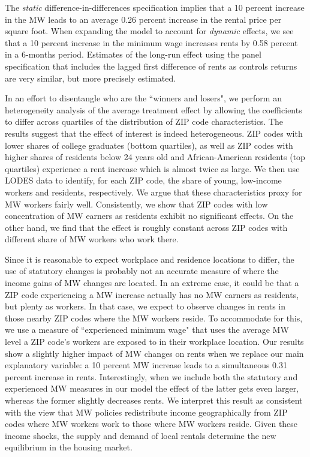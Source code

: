 The \textit{static} difference-in-differences specification implies that a 10 percent increase 
in the MW leads to an average 0.26 percent increase in the rental price per square foot. When 
expanding the model to account for \textit{dynamic} effects, we see that a 10 percent increase 
in the minimum wage increases rents by 0.58 percent in a 6-months period. Estimates of the 
long-run effect using the panel specification that includes the lagged first difference of rents 
as controls returns are very similar, but more precisely estimated.

In an effort to disentangle who are the ``winners and losers", we perform an heterogeneity 
analysis of the average treatment effect by allowing the coefficients to differ across quartiles 
of the distribution of ZIP code characteristics. The results suggest that the effect of interest 
is indeed heterogeneous. ZIP codes with lower shares of college graduates (bottom quartiles), as 
well as ZIP codes with higher shares of residents below 24 years old and African-American 
residents (top quartiles) experience a rent increase which is almost twice as large. We then use 
LODES data to identify, for each ZIP code, the share of young, low-income workers and residents, 
respectively. We argue that these characteristics proxy for MW workers fairly well. 
Consistently, we show that ZIP codes with low concentration of MW earners as residents 
exhibit no significant effects. On the other hand, we find that the effect is roughly constant 
across ZIP codes with different share of MW workers who work there.

Since it is reasonable to expect workplace and residence locations to differ, the use of 
statutory changes is probably not an accurate measure of where the income gains of MW changes
are located. In an extreme case, it could be that a ZIP code experiencing a MW increase actually 
has no MW earners as residents, but plenty as workers. In that case, we expect to observe 
changes in rents in those nearby ZIP codes where the MW workers reside. To accommodate for 
this, we use a measure of ``experienced minimum wage" that uses the average MW level 
a ZIP code's workers are exposed to in their workplace location. Our results show a slightly 
higher impact of MW changes on rents when we replace our main explanatory variable: a 10 
percent MW increase leads to a simultaneous 0.31 percent increase in rents. Interestingly, 
when we include both the statutory and experienced MW measures in our model the effect of 
the latter gets even larger, whereas the former slightly decreases rents. We interpret this
result as consistent with the view that MW policies redistribute income geographically from ZIP 
codes where MW workers work to those where MW workers reside.
Given these income shocks, the supply and demand of local rentals 
determine the new equilibrium in the housing market.

